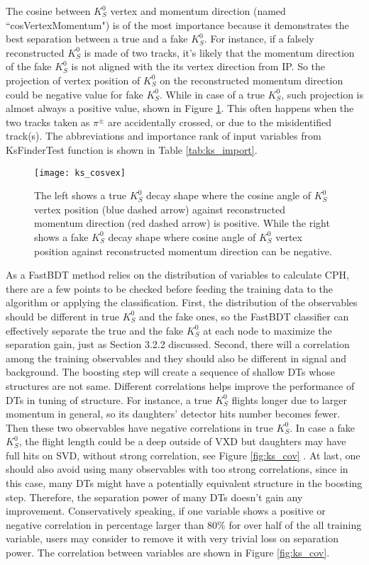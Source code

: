 The cosine between $K_S^0$ vertex and momentum direction (named ``cosVertexMomentum") is of the most importance because it demonstrates the best separation between a true and a fake $K_S^0$. For instance, if a falsely reconstructed $K_S^0$ is made of two tracks, it's likely that the momentum direction of the fake $K_S^0$ is not aligned with the its vertex direction from IP. So the projection of vertex position of $K_S^0$ on the reconstructed momentum direction could be negative value for fake $K_S^0$. While in case of a true $K_S^0$, such projection is almost always a positive value, shown in Figure \ref{fig:ks_cosvex}. This often happens when the two tracks taken as $\pi^{\pm}$ are accidentally crossed, or due to the misidentified track(s). The abbreviations and importance rank of input variables from KsFinderTest function is shown in Table 
\ref{tab:ks_import}.

\begin{figure}[htbp]
	\centering
	\texttt{[image: ks\_cosvex]}
	\caption{The left shows a true $K_S^0$ decay shape where the cosine angle of $K_S^0$ vertex position (blue dashed arrow) against reconstructed momentum direction (red dashed arrow) is positive. While the right shows a fake $K_S^0$ decay shape where cosine angle of $K_S^0$ vertex position against reconstructed momentum direction can be negative. }
	\label{fig:ks_cosvex}
\end{figure}
 
As a FastBDT method relies on the distribution of variables to calculate CPH, there are a few points to be checked before feeding the training data to the algorithm or applying the classification. First, the distribution of the observables should be different in true $K_S^0$ and the fake ones, so the FastBDT classifier can effectively separate the true and the fake $K_S^0$ at each node to maximize the separation gain, just as Section 3.2.2 discussed. Second, there will a correlation among the training observables and they should also be different in signal and background. The boosting step will create a sequence of shallow DTs whose structures are not same. Different correlations helps improve the performance of DTs in tuning of structure. For instance, a true $K_S^0$ flights longer due to larger momentum in general, so its daughters' detector hits number becomes fewer. Then these two observables have negative correlations in true $K_S^0$. In case a fake $K_S^0$, the flight length could be a deep outside of VXD  but daughters may have full hits on SVD, without strong correlation, see Figure  \ref{fig:ks_cov} . At last, one should also avoid using many observables with too strong correlations, since in this case, many DTs might have a potentially equivalent structure in the boosting step. Therefore, the separation power of many DTs doesn't gain any improvement. Conservatively speaking, if one variable shows a positive or negative correlation in percentage larger than 80\% for over half of the all training variable, users may consider to remove it with very trivial loss on separation power. The correlation between variables are shown in Figure \ref{fig:ks_cov}.

